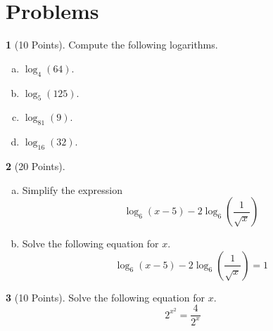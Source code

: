 \documentclass[12pt]{amsart}
\theoremstyle{definition}
\newtheorem{thm}{}
\begin{document}

\newpage

\section{Problems}

\begin{thm}[10 Points]
  Compute the following logarithms.
  \begin{enumerate}[(a)]
  \item
    $\log_{4}(64)$.
    \vspace{1.5in}
  \item
    $\log_{5}(125)$.
    \vspace{1.5in}
  \item
    $\log_{81}(9)$.
    \vspace{1.5in}
  \item
    $\log_{16}(32)$.
    \vspace{1.5in}
  \end{enumerate}
\end{thm}

\newpage

\begin{thm}[20 Points]
  \begin{enumerate}[(a)]
  \item
    Simplify the expression 
    $$\log_6(x - 5) - 2\log_6\left(\frac{1}{\sqrt{x}}\right)$$
    \vspace{3in}
  \item
    Solve the following equation for $x$.
    $$\log_6(x - 5) - 2\log_6\left(\frac{1}{\sqrt{x}}\right) = 1$$
  \end{enumerate}
\end{thm}

\newpage

\begin{thm}[10 Points]
  Solve the following equation for $x$.
  $$2^{x^2} = \frac{4}{2^x}$$
\end{thm}
\end{document}
